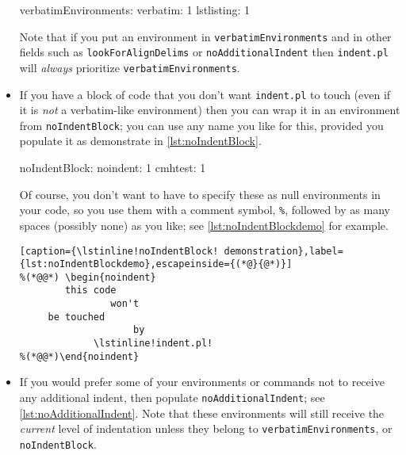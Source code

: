 \begin{itemize}
 		\begin{yaml}[caption={\lstinline!verbatimEnvironments!},label={lst:verbatimEnvironments}]
verbatimEnvironments:
    verbatim: 1
    lstlisting: 1
 		\end{yaml}
 		Note that if  you put an environment in \lstinline!verbatimEnvironments! 
 		and in other fields such as \lstinline!lookForAlignDelims! or \lstinline!noAdditionalIndent! 
 		then \lstinline!indent.pl! will \emph{always} prioritize \lstinline!verbatimEnvironments!.
 		 					
 		\item[\verbitem{noIndentBlock}] If you have a block of code that you don't 
 		want \lstinline!indent.pl! to touch (even if it is \emph{not} a verbatim-like
 		environment) then you can wrap it in an environment from \lstinline!noIndentBlock!;
 		you can use any name you like for this, provided you populate it as demonstrate in 
 		\cref{lst:noIndentBlock}.
 		 					
 		\begin{yaml}[caption={\lstinline!noIndentBlock!},label={lst:noIndentBlock}]
noIndentBlock:
    noindent: 1
    cmhtest: 1
 		\end{yaml}
 		 					
 		Of course, you don't want to have to specify these as null environments
 		in your code, so you use them with a comment symbol, \lstinline!%!, followed 
 		by as many spaces (possibly none) as you like; see \cref{lst:noIndentBlockdemo} for 
 		example.
 		\begin{lstlisting}[caption={\lstinline!noIndentBlock! demonstration},label={lst:noIndentBlockdemo},escapeinside={(*@}{@*)}]
%(*@@*) \begin{noindent} 
        this code
                won't 
     be touched
                    by 
             \lstinline!indent.pl!
%(*@@*)\end{noindent} 
 		\end{lstlisting}
 		 					
 		\item[\verbitem{noAdditionalIndent}] If you would prefer some of your
 		environments or commands not to receive any additional indent, then 
 		populate \lstinline!noAdditionalIndent!; see \cref{lst:noAdditionalIndent}. 
 		Note that these environments will still receive the \emph{current} level
 		of indentation unless they belong to \lstinline!verbatimEnvironments!, or \lstinline!noIndentBlock!.
 		 					

\end{itemize}
